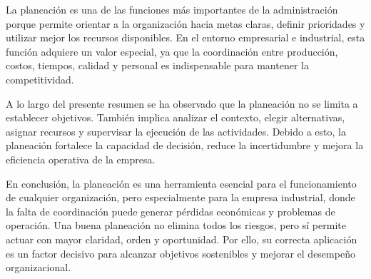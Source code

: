 La planeación es una de las funciones más importantes de la administración porque permite orientar a la organización hacia metas claras, definir prioridades y utilizar mejor los recursos disponibles. En el entorno empresarial e industrial, esta función adquiere un valor especial, ya que la coordinación entre producción, costos, tiempos, calidad y personal es indispensable para mantener la competitividad.

A lo largo del presente resumen se ha observado que la planeación no se limita a establecer objetivos. También implica analizar el contexto, elegir alternativas, asignar recursos y supervisar la ejecución de las actividades. Debido a esto, la planeación fortalece la capacidad de decisión, reduce la incertidumbre y mejora la eficiencia operativa de la empresa.

En conclusión, la planeación es una herramienta esencial para el funcionamiento de cualquier organización, pero especialmente para la empresa industrial, donde la falta de coordinación puede generar pérdidas económicas y problemas de operación. Una buena planeación no elimina todos los riesgos, pero sí permite actuar con mayor claridad, orden y oportunidad. Por ello, su correcta aplicación es un factor decisivo para alcanzar objetivos sostenibles y mejorar el desempeño organizacional.
